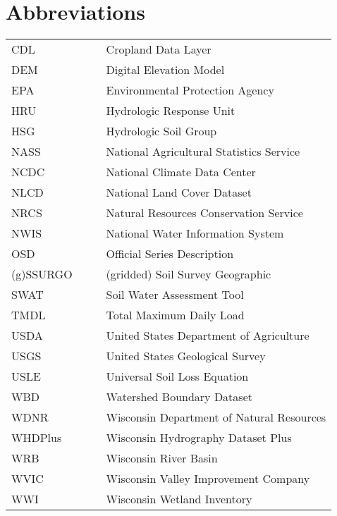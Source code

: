 \section*{Abbreviations}

\begin{tabular}{l c c l}

CDL		&	& &	Cropland Data Layer				\\
DEM		&	& &	Digital Elevation Model			\\
EPA		&	& &	Environmental Protection Agency	\\
HRU 	& 	& &	Hydrologic Response Unit 		\\
HSG		&	& &	Hydrologic Soil Group			\\
NASS	&	& &	National Agricultural Statistics Service \\
NCDC	&	& &	National Climate Data Center \\
NLCD	&	& &	National Land Cover Dataset	\\
NRCS	& 	& &	Natural Resources Conservation Service \\
NWIS	&	& &	National Water Information System \\
OSD		&	& &	Official Series Description \\
(g)SSURGO	& & &	(gridded) Soil Survey Geographic \\
SWAT 	& 	& &	Soil Water Assessment Tool 		\\
TMDL	&	& &	Total Maximum Daily Load		\\
USDA	&	& &	United States Department of Agriculture\\
USGS 	&	& &	United States Geological Survey \\
USLE	&	& &	Universal Soil Loss Equation	\\
WBD		&	& &	Watershed Boundary Dataset		\\
WDNR	&	& &	Wisconsin Department of Natural Resources \\
WHDPlus	&	& &	Wisconsin Hydrography Dataset Plus \\
WRB		&	& &	Wisconsin River Basin			\\
WVIC	&	& &	Wisconsin Valley Improvement Company \\
WWI		&	& &	Wisconsin Wetland Inventory		\\
\end{tabular}

\clearpage
